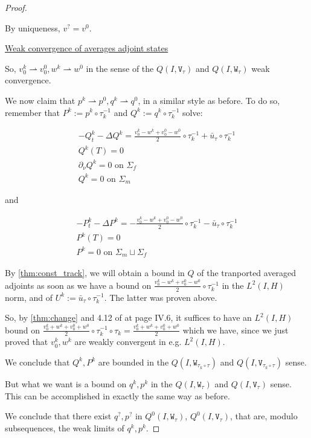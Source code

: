 \documentclass[english,a4paper,9pt,oneside]{scrbook}	%
\theoremstyle{break}
\newenvironment{mproof}[1][\proofname]{%
  \begin{proof}[#1]$ $\par\nobreak\ignorespaces
}{%
  \end{proof}
}
\renewcommand*{\proofname}{Proof}
\theoremstyle{remark}
\newcommand{\ds}{\displaystyle}
\newcommand{\weakc}{\rightharpoonup}
\newcommand{\tw}[1]{\texttt{#1}}
\begin{document}
\begin{mproof}
By uniqueness, $v^?=v^0$.

\underline{Weak convergence of averages adjoint states}

So, $v_0^k \weakc v_0^0, w^k\weakc w^0$ in the sense of the $Q(I,\tw{V}_\tau)$ and $Q(I,\tw{W}_\tau)$ weak convergence.

We now claim that $p^k \weakc p^0, q^k\weakc q^0$, in a similar style as before. To do so, remember that $P^k:=p^k\circ \tau_k^{-1}$ and $Q^k:=q^k\circ \tau_k^{-1}$ solve:

\begin{align*}
-Q^k_t-\Delta Q^k =\frac{v_0^k-w^k+v_0^0-w^0}{2}\circ \tau_k^{-1}+\bar{u}_\tau\circ \tau_k^{-1} \\
Q^k(T)=0\\
\partial_\nu Q^k = 0 \text{ on } \Sigma_f\\
Q^k = 0 \text{ on } \Sigma_m
\end{align*}

and

\begin{align*}
-P^k_t-\Delta P^k =-\frac{v_0^k-w^k+v_0^0-w^0}{2}\circ \tau_k^{-1}-\bar{u}_\tau\circ \tau_k^{-1} \\
P^k(T)=0\\
P^k = 0 \text{ on } \Sigma_m \sqcup \Sigma_f
\end{align*}

By \cref{thm:const_track}, we will obtain a bound in $Q$ of the tranported averaged adjoints as soon as we have a bound on $\ds \frac{v_0^k-w^k+v_0^0-w^0}{2}\circ \tau_k^{-1}$ in the $L^2(I,H)$ norm, and of $U^k:=\bar{u}_\tau\circ \tau_k^{-1}$. The latter was proven above.

So, by \cref{thm:change} and 4.12 of \cite{murat} at page IV.6, it suffices to have an $L^2(I,H)$ bound on $\ds \frac{v_0^k+w^k+v_0^0+w^0}{2}\circ \tau_k^{-1}\circ \tau_k = \frac{v_0^k+w^k+v_0^0+w^0}{2}$ which we have, since we just proved that $v_0^k, w^k$ are weakly convergent in e.g. $L^2(I,H)$.

We conclude that $Q^k,P^k$ are bounded in the $Q(I,\tw{W}_{\tau_k\circ \tau})$ and $Q(I,\tw{V}_{\tau_k\circ \tau})$ sense.

But what we want is a bound on $q^k, p^k$ in the $Q(I,\tw{W}_{ \tau})$ and $Q(I,\tw{V}_{ \tau})$ sense. This can be accomplished in exactly the same way as before.

We conclude that there exist $q^?, p^?$ in $Q^0(I,\tw{W}_{ \tau})$, $Q^0(I,\tw{V}_{ \tau})$, that are, modulo subsequences, the weak limits of $q^k, p^k$.


\end{mproof}
\end{document}
